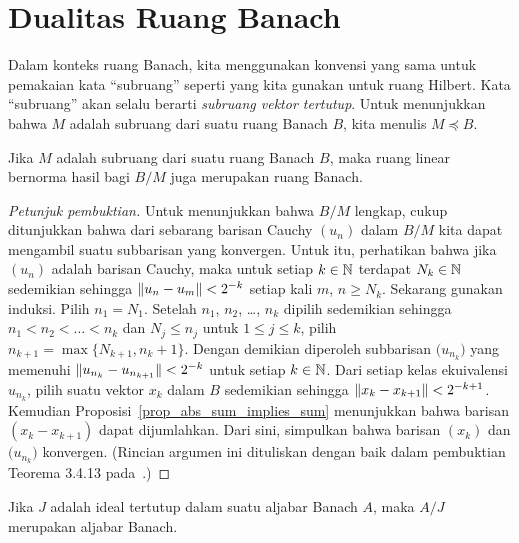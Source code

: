 \section{Dualitas Ruang Banach}

\begin{conv}\label{conv_subsp_Bsp} Dalam konteks ruang Banach, kita menggunakan konvensi yang sama untuk pemakaian kata
``subruang'' seperti yang kita gunakan untuk ruang Hilbert. Kata ``subruang'' akan selalu berarti
\emph{subruang vektor tertutup}. Untuk menunjukkan bahwa $M$ adalah subruang dari suatu ruang Banach $B$, kita menulis
$M \preccurlyeq B$.
\end{conv}

\begin{prop} Jika $M$ adalah subruang dari suatu ruang Banach $B$,
maka ruang linear bernorma hasil bagi $B/M$ juga merupakan ruang Banach.
\end{prop}

\begin{proof}[\emph{Petunjuk pembuktian}] Untuk menunjukkan bahwa $B/M$ lengkap, cukup ditunjukkan bahwa dari
sebarang barisan Cauchy $(u_n)$ dalam $B/M$ kita dapat mengambil suatu subbarisan yang konvergen. Untuk itu,
perhatikan bahwa jika $(u_n)$ adalah barisan Cauchy, maka untuk setiap $k \in \mathbb{N}$ terdapat $N_k \in \mathbb{N}$ sedemikian sehingga
$\lVert u_n - u_m\rVert < 2^{-k}$ setiap kali $m$, $n \ge N_k$. Sekarang gunakan induksi. Pilih $n_1 = N_1$.
Setelah $n_1$, $n_2$, \dots, $n_k$ dipilih sedemikian sehingga $n_1 < n_2 < \dots < n_k$ dan $N_j \le n_j$ untuk
$1 \le j \le k$, pilih $n_{k+1} = \max\{N_{k+1}, n_k + 1\}$. Dengan demikian diperoleh subbarisan
$\bigl(u_{n_k}\bigr)$ yang memenuhi $\lVert u_{n_k} - u_{n_{k+1}}\rVert < 2^{-k}$ untuk setiap $k \in \mathbb{N}$.
Dari setiap kelas ekuivalensi $u_{n_k}$, pilih suatu vektor $x_k$ dalam $B$ sedemikian sehingga $\lVert x_k - x_{k+1}\rVert < 2^{-k+1}$.
Kemudian Proposisi~\ref{prop_abs_sum_implies_sum} menunjukkan bahwa barisan $(x_k - x_{k+1})$ dapat
dijumlahkan. Dari sini, simpulkan bahwa barisan $(x_k)$ dan $\bigl(u_{n_k}\bigr)$ konvergen.
(Rincian argumen ini dituliskan dengan baik dalam pembuktian Teorema 3.4.13 pada~\cite{BrownP:1970}.) \ns
\end{proof}

\begin{prop} Jika $J$ adalah ideal tertutup dalam suatu aljabar Banach $A$,
maka $A/J$ merupakan aljabar Banach.
\end{prop}

